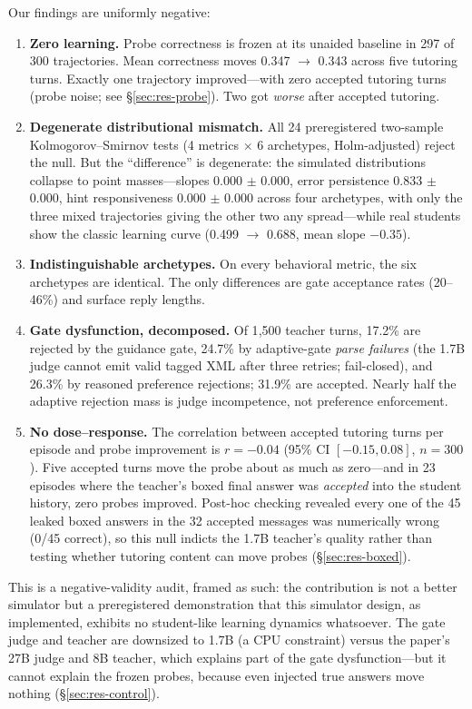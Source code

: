 \documentclass[notitlepage,12pt]{jedm}
\begin{document}
Our findings are uniformly negative:

\begin{enumerate}
\item \textbf{Zero learning.} Probe correctness is frozen at its unaided
baseline in 297 of 300 trajectories. Mean correctness moves 0.347
$\rightarrow$ 0.343 across five tutoring turns. Exactly one trajectory
improved---with zero accepted tutoring turns (probe noise; see
\S\ref{sec:res-probe}). Two got
\emph{worse} after accepted tutoring.
\item \textbf{Degenerate distributional mismatch.} All 24 preregistered
two-sample Kolmogorov--Smirnov tests (4 metrics $\times$ 6 archetypes,
Holm-adjusted) reject the null. But the ``difference'' is degenerate:
the simulated distributions collapse to point masses---slopes $0.000$
$\pm$ 0.000, error persistence $0.833$ $\pm$ 0.000, hint
responsiveness $0.000$ $\pm$ 0.000 across four archetypes, with only the three
mixed trajectories giving the other two any spread---while real students show the
classic learning curve (0.499 $\rightarrow$ 0.688, mean slope $-0.35$).
\item \textbf{Indistinguishable archetypes.} On every behavioral metric, the
six archetypes are identical. The only differences are gate acceptance rates
(20--46\%) and surface reply lengths.
\item \textbf{Gate dysfunction, decomposed.} Of 1{,}500 teacher turns, 17.2\%
are rejected by the guidance gate, 24.7\% by adaptive-gate \emph{parse
failures} (the 1.7B judge cannot emit valid tagged XML after three retries;
fail-closed), and 26.3\% by reasoned preference rejections; 31.9\% are
accepted. Nearly half the adaptive rejection mass is judge incompetence, not
preference enforcement.
\item \textbf{No dose--response.} The correlation between accepted tutoring
turns per episode and probe improvement is $r=-0.04$ (95\% CI $[-0.15,
0.08]$, $n=300$). Five accepted turns move the probe about as much as
zero---and in 23 episodes where the teacher's boxed final answer was
\emph{accepted} into the student history, zero probes improved. Post-hoc
checking revealed every one of the 45 leaked boxed answers in the 32
accepted messages was numerically wrong (0/45 correct), so this null
indicts the 1.7B teacher's quality rather than testing whether tutoring
content can move probes (\S\ref{sec:res-boxed}).
\end{enumerate}

This is a negative-validity audit, framed as such: the contribution is not a
better simulator but a preregistered demonstration
that this simulator design, as implemented, exhibits no
student-like learning dynamics whatsoever. The gate judge and teacher are
downsized to 1.7B (a CPU constraint) versus the paper's 27B judge and 8B
teacher, which explains part of the gate dysfunction---but it cannot explain
the frozen probes, because even injected true answers move nothing
(\S\ref{sec:res-control}).
\end{document}
